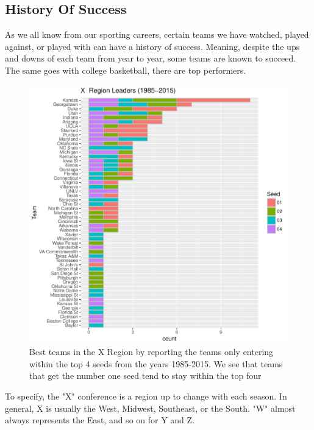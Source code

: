 \documentclass[]{scrartcl}
\begin{document}
\subsection*{History Of Success}
As we all know from our sporting careers, certain teams we have watched, played against, or played with can have a history of success. Meaning, despite the ups and downs of each team from year to year, some teams are known to succeed. The same goes with college basketball, there are top performers.
\begin{figure}[H]
	\centering
	\includegraphics[scale=.75]{XConfLeader.pdf}
	\caption[leaders]{Best teams in the X Region by reporting the teams only entering within the top 4 seeds from the years 1985-2015. We see that teams that get the number one seed tend to stay within the top four }
	\label{rVals}
\end{figure}
To specify, the "X" conference is a region up to change with each season. In general, X is usually the West, Midwest, Southeast, or the South. "W" almost always represents the East, and so on for Y and Z. 
\end{document}

